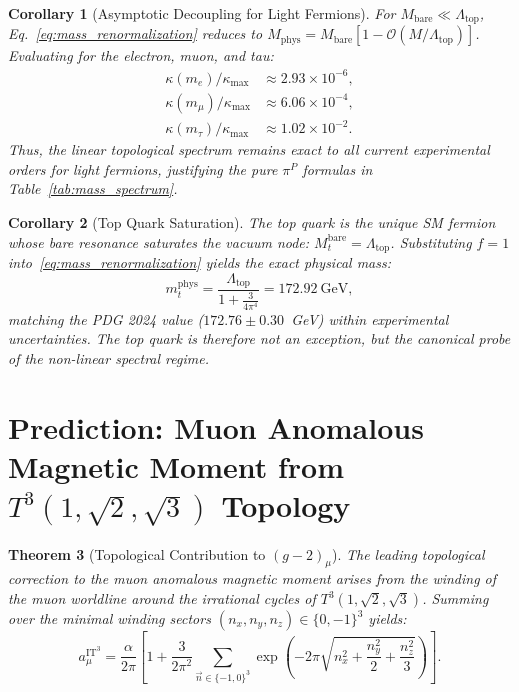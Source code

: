 \documentclass[onecolumn,aps,prd,superscriptaddress,nofootinbib,amsmath,amssymb]{revtex4-2}
\newtheorem{theorem}{Theorem}[section]
\newtheorem{corollary}[theorem]{Corollary}
\theoremstyle{definition}
\theoremstyle{remark}
\newcommand{\ITthree}{\ensuremath{\mathrm{IT}^3}}
\newcommand{\Tthree}{T^3(1,\sqrt{2},\sqrt{3})}
\begin{document}
\begin{corollary}[Asymptotic Decoupling for Light Fermions]
For $M_{\text{bare}} \ll \Lambda_{\text{top}}$, Eq.~\eqref{eq:mass_renormalization} reduces to $M_{\text{phys}} = M_{\text{bare}} [1 - \mathcal{O}(M/\Lambda_{\text{top}})]$. 
Evaluating for the electron, muon, and tau:
\begin{align*}
\kappa(m_e)/\kappa_{\text{max}} &\approx 2.93 \times 10^{-6}, \\
\kappa(m_\mu)/\kappa_{\text{max}} &\approx 6.06 \times 10^{-4}, \\
\kappa(m_\tau)/\kappa_{\text{max}} &\approx 1.02 \times 10^{-2}.
\end{align*}
Thus, the linear topological spectrum remains exact to all current experimental orders for light fermions, justifying the pure $\pi^P$ formulas in Table~\ref{tab:mass_spectrum}.
\end{corollary}

\begin{corollary}[Top Quark Saturation]
The top quark is the unique SM fermion whose bare resonance saturates the vacuum node: $M_t^{\text{bare}} = \Lambda_{\text{top}}$. Substituting $f=1$ into~\eqref{eq:mass_renormalization} yields the exact physical mass:
\begin{equation}
m_t^{\text{phys}} = \frac{\Lambda_{\text{top}}}{1 + \frac{3}{4\pi^4}} = 172.92~\text{GeV},
\label{eq:top_universal}
\end{equation}
matching the PDG 2024 value ($172.76 \pm 0.30$~GeV) within experimental uncertainties. The top quark is therefore not an exception, but the canonical probe of the non-linear spectral regime.
\end{corollary}

\section{Prediction: Muon Anomalous Magnetic Moment from $\Tthree$ Topology}
\label{sec:gminus2}

\begin{theorem}[Topological Contribution to $(g-2)_\mu$]
\label{thm:gm2}
The leading topological correction to the muon anomalous magnetic moment arises from 
the winding of the muon worldline around the irrational cycles of $\Tthree$.
Summing over the minimal winding sectors $(n_x,n_y,n_z) \in \{0,-1\}^3$ yields:
\begin{equation}
a_\mu^{\ITthree} = \frac{\alpha}{2\pi} \left[ 1 + \frac{3}{2\pi^2} \sum_{\vec{n} \in \{-1,0\}^3} 
\exp\left( -2\pi \sqrt{ n_x^2 + \frac{n_y^2}{2} + \frac{n_z^2}{3} } \right) \right].
\label{eq:gm2_formula}
\end{equation}
\end{theorem}
\end{document}
